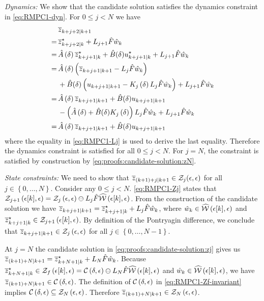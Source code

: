 \noindent\textit{Dynamics:}
%
We show that the candidate solution satisfies the dynamics constraint
in \eqref{eq:RMPC1-dyn}. For $0\leq j<N$ we have
\begin{align*}
&\overline{z}_{k+j+2| k+1} \\
=\, & \overline{z}_{k+j+2| k}^{\star}+L_{j+1}\hat{F}\hat{w}_{k}\\
=\, &\hat{A}\left(\delta\right)\overline{z}_{k+j+1| k}^{\star}+\hat{B}(\delta)u_{k+j+1| k}^{\star}+L_{j+1}\hat{F}\hat{w}_{k}\\
=\, &\hat{A}\left(\delta\right)\left(\overline{z}_{k+j+1| k+1}-L_{j}\hat{F}\hat{w}_{k}\right) \\
&+\hat{B}(\delta)\left(u_{k+j+1| k+1}-K_{j}\left(\delta\right)L_{j}\hat{F}\hat{w}_{k}\right) +L_{j+1}\hat{F}\hat{w}_{k} \\
=\, &\hat{A}\left(\delta\right)\overline{z}_{k+j+1| k+1}+\hat{B}(\delta)u_{k+j+1| k+1} \\
&-\left(\hat{A}\left(\delta\right) + \hat{B}(\delta)K_{j}\left(\delta\right)\right)L_{j}\hat{F}\hat{w}_{k}+L_{j+1}\hat{F}\hat{w}_{k}\\
=\, &\hat{A}\left(\delta\right)\overline{z}_{k+j+1| k+1}+\hat{B}(\delta)u_{k+j+1| k+1}
\end{align*}
where the equality in \eqref{eq:RMPC1-Lj} is used to derive the last
equality. %
Therefore the dynamics constraint
is satisfied for all $0\leq j<N$. For $j=N$, the constraint is satisfied
by construction by \eqref{eq:proofs:candidate-solution:zN}.


\noindent\textit{State constraints:}
%
We need to show that $\overline{z}_{(k+1)+j| k+1}\in\mathcal{Z}_{j}\text{\ensuremath{\left(\epsilon,\epsilon\right)}}$
for all $j\in\left\{ 0,\dots,N\right\} $. Consider any $0\leq j<N$.
\eqref{eq:RMPC1-Zj} states that $\mathcal{Z}_{j+1}\left(\epsilon[k],\epsilon\right)=\mathcal{Z}_{j}\left(\epsilon,\epsilon\right)\ominus L_{j}\hat{F}\widehat{\mathcal{W}}\left(\epsilon[k],\epsilon\right)$.
From the construction of the candidate solution we have $\overline{z}_{k+j+1| k+1}=\overline{z}_{k+j+1| k}^{\star}+L_{j}\hat{F}\hat{w}_{k}$,
where $\hat{w}_{k}\in\widehat{\mathcal{W}}\left(\epsilon[k],\epsilon\right)$ and $\overline{z}_{k+j+1| k}^{\star}\in\mathcal{Z}_{j+1}\left(\epsilon[k],\epsilon\right)$.
By definition of the Pontryagin difference, we conclude that $\overline{z}_{k+j+1| k+1}\in\mathcal{Z}_{j}\left(\epsilon,\epsilon\right)$
for all $j\in\left\{ 0,\dots,N-1\right\} $.

At $j=N$ the candidate solution in \eqref{eq:proofs:candidate-solution:zj}
gives us $\overline{z}_{(k+1)+N| k+1}=\overline{z}_{k+N+1| k}^{\star}+L_{N}\hat{F}\hat{w}_{k}$.
Because $\overline{z}_{k+N+1| k}^{\star}\in\mathcal{Z}_{f}\left(\epsilon[k],\epsilon\right)=\mathcal{C}\left(\delta,\epsilon\right)\ominus L_{N}\hat{F}\widehat{\mathcal{W}}\left(\epsilon[k],\epsilon\right)$
and $\hat{w}_{k}\in\widehat{\mathcal{W}}\left(\epsilon[k],\epsilon\right)$, we have
$\overline{z}_{(k+1)+N| k+1}\in\mathcal{C}\left(\delta,\epsilon\right)$. The
definition of $\mathcal{C}\left(\delta,\epsilon\right)$ in \eqref{eq:RMPC1-Zf-invariant}
implies $\mathcal{C}\left(\delta,\epsilon\right)\subseteq\mathcal{Z}_{N}\left(\epsilon,\epsilon\right)$.
Therefore $\overline{z}_{(k+1)+N| k+1}\in\mathcal{Z}_{N}\left(\epsilon,\epsilon\right)$.


